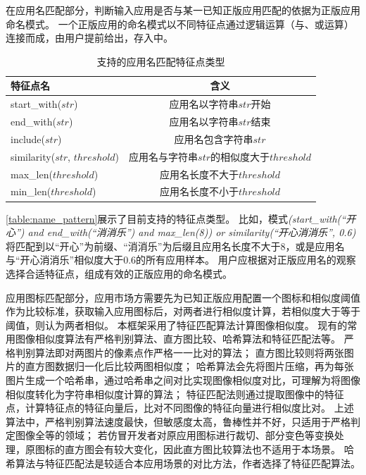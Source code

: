 在应用名匹配部分，判断输入应用是否与某一已知正版应用匹配的依据为正版应用命名模式。
一个正版应用的命名模式以不同特征点通过逻辑运算（与、或运算）连接而成，由用户提前给出，存入\componentE 中。

\begin{table}[htbp]
    \renewcommand{\arraystretch}{1}
    \footnotesize
    \centering
    \caption{\mytool 支持的应用名匹配特征点类型}
    \vspace{1mm}
    \begin{tabular}{l c}
        \toprule
        {\bf 特征点名}                 & {\bf 含义}                                 \\
        \midrule
        start\_with($str$)             & 应用名以字符串$str$开始                    \\
        end\_with($str$)               & 应用名以字符串$str$结束                    \\
        include($str$)                 & 应用名包含字符串$str$                      \\
        similarity($str$, $threshold$) & 应用名与字符串$str$的相似度大于$threshold$ \\
        max\_len($threshold$)          & 应用名长度不大于$threshold$                \\
        min\_len($threshold$)          & 应用名长度不小于$threshold$                \\
        \bottomrule
    \end{tabular}
    \label{table:name_pattern}
\end{table}

\autoref{table:name_pattern}展示了\mytool 目前支持的特征点类型。
比如，模式\textit{(start\_with(``开心'') and end\_with(``消消乐'') and max\_len(8)) or similarity(``开心消消乐'', 0.6)}将匹配到以``开心''为前缀、``消消乐''为后缀且应用名长度不大于8，或是应用名与``开心消消乐''相似度大于0.6的所有应用样本。
用户应根据对正版应用名的观察选择合适特征点，组成有效的正版应用的命名模式。

应用图标匹配部分，应用市场方需要先为已知正版应用配置一个图标和相似度阈值作为比较标准，\componentA 获取输入应用图标后，对两者进行相似度计算，若相似度大于等于阈值，则认为两者相似。
本框架采用了特征匹配算法计算图像相似度。
现有的常用图像相似度算法有严格判别算法、直方图比较、哈希算法和特征匹配法等。
严格判别算法即对两图片的像素点作严格一一比对的算法；
直方图比较则将两张图片的直方图数据归一化后比较两图相似度；
哈希算法会先将图片压缩，再为每张图片生成一个哈希串，通过哈希串之间对比实现图像相似度对比，可理解为将图像相似度转化为字符串相似度计算的算法；
特征匹配法则通过提取图像中的特征点，计算特征点的特征向量后，比对不同图像的特征向量进行相似度比对。
上述算法中，严格判别算法速度最快，但敏感度太高，鲁棒性并不好，只适用于严格判定图像全等的领域；
若仿冒开发者对原应用图标进行裁切、部分变色等变换处理，原图标的直方图会有较大变化，因此直方图比较算法也不适用于本场景。
哈希算法与特征匹配法是较适合本应用场景的对比方法，作者选择了特征匹配算法。

